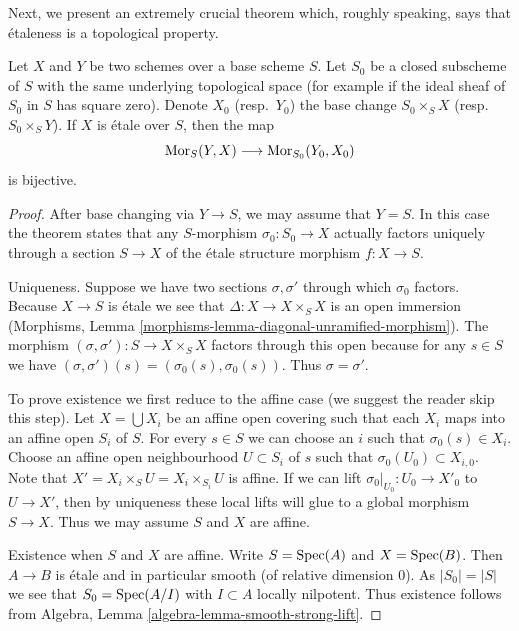 \noindent
Next, we present an extremely crucial theorem which, roughly speaking, says
that \'etaleness is a topological property.

\begin{theorem}
\label{theorem-etale-topological}
Let $X$ and $Y$ be two schemes over a base scheme $S$. Let $S_0$ be a closed
subscheme of $S$ with the same underlying topological space
(for example if the ideal sheaf of $S_0$ in $S$ has square zero).
Denote $X_0$ (resp.\ $Y_0$) the base change $S_0 \times_S X$
(resp.\ $S_0 \times_S Y$).
If $X$ is \'etale over $S$, then the map
$$
\mathop{\mathrm{Mor}}\nolimits_S(Y, X) \longrightarrow \mathop{\mathrm{Mor}}\nolimits_{S_0}(Y_0, X_0)
$$
is bijective.
\end{theorem}

\begin{proof}
After base changing via $Y \to S$, we may assume that $Y = S$.
In this case the theorem states that any $S$-morphism $\sigma_0 : S_0 \to X$
actually factors uniquely through a section $S \to X$ of the
\'etale structure morphism $f : X \to S$.

\medskip\noindent
Uniqueness. Suppose we have two sections $\sigma, \sigma'$
through which $\sigma_0$ factors. Because $X \to S$ is \'etale
we see that $\Delta : X \to X \times_S X$ is an open immersion
(Morphisms, Lemma \ref{morphisms-lemma-diagonal-unramified-morphism}).
The morphism $(\sigma, \sigma') : S \to X \times_S X$ factors
through this open because for any $s \in S$ we have
$(\sigma, \sigma')(s) = (\sigma_0(s), \sigma_0(s))$. Thus
$\sigma = \sigma'$.

\medskip\noindent
To prove existence we first reduce to the affine case
(we suggest the reader skip this step).
Let $X = \bigcup X_i$ be an affine open covering such
that each $X_i$ maps into an affine open $S_i$ of $S$.
For every $s \in S$ we can choose an $i$ such that
$\sigma_0(s) \in X_i$.
Choose an affine open neighbourhood $U \subset S_i$ of $s$
such that $\sigma_0(U_0) \subset X_{i, 0}$. Note that
$X' = X_i \times_S U = X_i \times_{S_i} U$ is affine.
If we can lift $\sigma_0|_{U_0} : U_0 \to X'_0$ to
$U \to X'$, then by uniqueness these local lifts will glue
to a global morphism $S \to X$. Thus we may assume $S$ and
$X$ are affine.

\medskip\noindent
Existence when $S$ and $X$ are affine. Write $S = \mathop{\mathrm{Spec}}(A)$
and $X = \mathop{\mathrm{Spec}}(B)$. Then $A \to B$ is \'etale and in particular
smooth (of relative dimension $0$). As $|S_0| = |S|$ we see
that $S_0 = \mathop{\mathrm{Spec}}(A/I)$ with $I \subset A$ locally nilpotent.
Thus existence follows from
Algebra, Lemma \ref{algebra-lemma-smooth-strong-lift}.
\end{proof}

